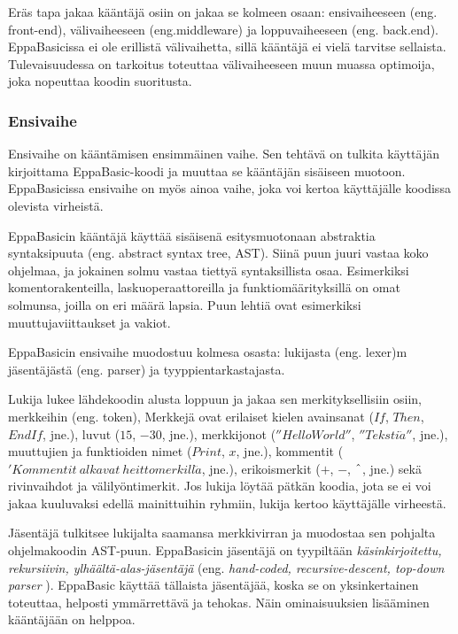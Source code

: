 Eräs tapa jakaa kääntäjä osiin on jakaa
se kolmeen osaan:
ensivaiheeseen (eng. front-end),
välivaiheeseen (eng.middleware) ja
loppuvaiheeseen (eng. back.end).
EppaBasicissa ei ole erillistä välivaihetta,
sillä kääntäjä ei vielä tarvitse sellaista.
Tulevaisuudessa on tarkoitus toteuttaa
välivaiheeseen muun muassa optimoija,
joka nopeuttaa koodin suoritusta.

\subsubsection{Ensivaihe}
Ensivaihe on kääntämisen ensimmäinen vaihe.
Sen tehtävä on tulkita käyttäjän kirjoittama
EppaBasic-koodi ja muuttaa se kääntäjän
sisäiseen muotoon.
EppaBasicissa ensivaihe on myös ainoa
vaihe, joka voi kertoa käyttäjälle
koodissa olevista virheistä.

EppaBasicin kääntäjä käyttää sisäisenä
esitysmuotonaan abstraktia syntaksipuuta
(eng. abstract syntax tree, AST).
Siinä puun juuri vastaa koko ohjelmaa,
ja jokainen solmu vastaa tiettyä
syntaksillista osaa.
Esimerkiksi komentorakenteilla,
laskuoperaattoreilla ja
funktiomäärityksillä
on omat solmunsa, joilla on eri määrä lapsia.
Puun lehtiä ovat esimerkiksi
muuttujaviittaukset ja vakiot.

EppaBasicin ensivaihe muodostuu
kolmesa osasta:
lukijasta (eng. lexer)m
jäsentäjästä (eng. parser) ja
tyyppientarkastajasta.

Lukija lukee lähdekoodin alusta loppuun
ja jakaa sen merkityksellisiin osiin,
merkkeihin (eng. token),
Merkkejä ovat erilaiset kielen
avainsanat ($If$, $Then$, $EndIf$, jne.),
luvut ($15$, $-30$, jne.),
merkkijonot ($''HelloWorld''$, $''Teksti\ddot{a}''$, jne.),
muuttujien ja funktioiden nimet ($Print$, $x$, jne.),
kommentit ($' Kommentit\ alkavat\ heittomerkill\ddot{a}$, jne.),
erikoismerkit ($+$, $-$, $\char`\^$, jne.) sekä
rivinvaihdot ja välilyöntimerkit.
Jos lukija löytää pätkän koodia,
jota se ei voi jakaa kuuluvaksi
edellä mainittuihin ryhmiin,
lukija kertoo käyttäjälle virheestä.

Jäsentäjä tulkitsee lukijalta saamansa
merkkivirran ja muodostaa sen pohjalta
ohjelmakoodin AST-puun.
EppaBasicin jäsentäjä on tyypiltään
\emph{käsinkirjoitettu, rekursiivin,
ylhäältä-alas-jäsentäjä}
(eng. \emph{hand-coded, recursive-descent,
top-down parser} \cite[kappale 3.3.2]{eac2e}).
EppaBasic käyttää tällaista jäsentäjää,
koska se on yksinkertainen toteuttaa,
helposti ymmärrettävä ja tehokas.
Näin ominaisuuksien lisääminen
kääntäjään on helppoa.

